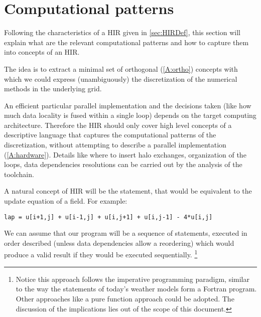 \documentclass[a4paper,10pt]{scrartcl}
\begin{document}
\section{Computational patterns}
\label{sec:comppatterns}
Following the characteristics of a HIR given in \cref{sec:HIRDef}, this section will explain 
what are the relevant computational patterns and how to capture them into concepts of an HIR.

The idea is to extract a minimal set of orthogonal (\ref{A:ortho}) concepts with which we could express (unambiguously) the discretization of the numerical methods in the underlying grid.

An efficient particular parallel implementation and the decisions taken (like how much data locality is fused within a single loop) depends on the target computing architecture. Therefore the HIR should only cover high level concepts of a descriptive language that captures the computational patterns of the discretization, without attempting to describe a parallel implementation (\ref{A:hardware}). 
Details like where to insert halo exchanges, organization of the loops, data dependencies resolutions can be carried out by the analysis of the toolchain.

A natural concept of HIR will be the statement, that would be equivalent to the update equation of a field. For example:
\begin{lstlisting}
lap = u[i+1,j] + u[i-1,j] + u[i,j+1] + u[i,j-1] - 4*u[i,j]
\end{lstlisting}

\begin{longfbox}[rounded]
	We can assume that our program will be a sequence of statements, executed in order described (unless data dependencies allow a reordering) which would produce a valid result if they would be executed sequentially. \footnote{Notice this approach follows the imperative programming paradigm, similar to the way the statements of today's weather models form a Fortran program. Other approaches like a pure function approach could be adopted. The discussion of the implications lies out of the scope of this document.}
\end{longfbox}
\end{document}
